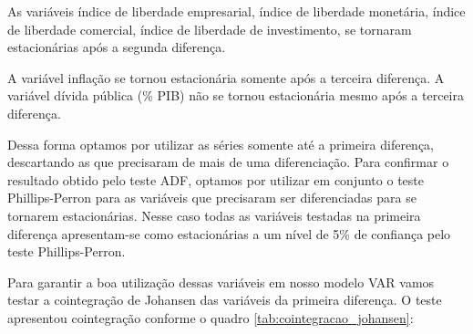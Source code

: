 As variáveis índice de liberdade empresarial, índice de liberdade monetária, índice de liberdade comercial, índice de liberdade de investimento, se tornaram estacionárias após a segunda diferença.

A variável inflação se tornou estacionária somente após a terceira diferença. A variável dívida pública (\% PIB) não se tornou estacionária mesmo após a terceira diferença.

Dessa forma optamos por utilizar as séries somente até a primeira diferença, descartando as que precisaram de mais de uma diferenciação. Para confirmar o resultado obtido pelo teste ADF, optamos por utilizar em conjunto o teste Phillips-Perron para as variáveis que precisaram ser diferenciadas para se tornarem estacionárias. Nesse caso todas as variáveis testadas na primeira diferença apresentam-se como estacionárias a um nível de 5\% de confiança pelo teste Phillips-Perron.

Para garantir a boa utilização dessas variáveis em nosso modelo VAR vamos testar a cointegração de Johansen das variáveis da primeira diferença. O teste apresentou cointegração conforme o quadro \ref{tab:cointegracao_johansen}:

